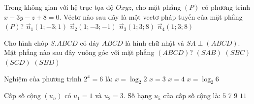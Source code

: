 \begin{ex}%
    Trong không gian với hệ trục tọa độ $Oxyz$, cho mặt phẳng $(P)$ có phương trình $x - 3y - z + 8 = 0$. Véctơ nào sau đây là một vectơ pháp tuyến của mặt phẳng $(P)$?
    \choice
    {$\overrightarrow{n}_1(1;-3;1)$}
    {\True $\overrightarrow{n}_2(1;-3;-1)$}
    {$\overrightarrow{n}_3(1;3;8)$}
    {$\overrightarrow{n}_4(1;3;8)$}
\end{ex}

\begin{ex}%
    Cho hình chóp $S.ABCD$ có đáy $ABCD$ là hình chữ nhật và $SA \perp (ABCD)$. Mặt phẳng nào sau đây vuông góc với mặt phẳng $(ABCD)$?
    \choice
    {\True $(SAB)$}
    {$(SBC)$}
    {$(SCD)$}
    {$(SBD)$}
\end{ex}

\begin{ex}%
    Nghiệm của phương trình $2^x = 6$ là:
    \choice
    {$x = \log_2 2$}
    {$x = 3$}
    {$x = 4$}
    {\True $x = \log_2 6$}
\end{ex}

\begin{ex}%
    Cấp số cộng $(u_n)$ có $u_1 = 1$ và $u_2 = 3$. Số hạng $u_5$ của cấp số cộng là:
    \choice
    {$5$}
    {$7$}
    {\True $9$}
    {$11$}
\end{ex}


